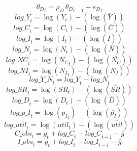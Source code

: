 \begin{dmath}
{{\theta_D}}_{t}={{\rho_D}}\, {{\theta_D}}_{t-1}-{{e_D}}_{t}
\end{dmath}
\begin{dmath}
{log\_Y}_{t}=\log\left({{Y}}_{t}\right)-(\log\left(\bar{{Y}}\right))
\end{dmath}
\begin{dmath}
{log\_C}_{t}=\log\left({{C}}_{t}\right)-(\log\left(\bar{{C}}\right))
\end{dmath}
\begin{dmath}
{log\_I}_{t}=\log\left({{I}}_{t}\right)-(\log\left(\bar{{I}}\right))
\end{dmath}
\begin{dmath}
{log\_N}_{t}=\log\left({{N}}_{t}\right)-(\log\left(\bar{{N}}\right))
\end{dmath}
\begin{dmath}
{log\_NC}_{t}=\log\left({{N_C}}_{t}\right)-(\log\left(\bar{{N_C}}\right))
\end{dmath}
\begin{dmath}
{log\_NI}_{t}=\log\left({{N_I}}_{t}\right)-(\log\left(\bar{{N_I}}\right))
\end{dmath}
\begin{dmath}
{log\_Y\_N}_{t}={log\_Y}_{t}-{log\_N}_{t}
\end{dmath}
\begin{dmath}
{log\_SR}_{t}=\log\left({{SR}}_{t}\right)-(\log\left(\bar{{SR}}\right))
\end{dmath}
\begin{dmath}
{log\_D}_{t}=\log\left({{D}}_{t}\right)-(\log\left(\bar{{D}}\right))
\end{dmath}
\begin{dmath}
{log\_p\_I}_{t}=\log\left({{p_I}}_{t}\right)-(\log\left(\bar{{p_I}}\right))
\end{dmath}
\begin{dmath}
{log\_util}_{t}=\log\left({util}_{t}\right)-(\log\left(\bar{util}\right))
\end{dmath}
\begin{dmath}
{C\_obs}_{t}={{g}}_{t}+{log\_C}_{t}-{log\_C}_{t-1}-{{\overline{g}}}
\end{dmath}
\begin{dmath}
{I\_obs}_{t}={{g}}_{t}+{log\_I}_{t}-{log\_I}_{t-1}-{{\overline{g}}}
\end{dmath}
